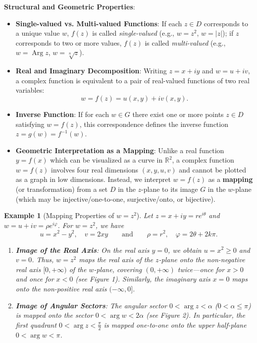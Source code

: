 \documentclass[11pt,a4paper]{article}
\theoremstyle{definitionbreak}
\theoremstyle{examplebreak}
\newtheorem{example}{Example}
\theoremstyle{plain}
\begin{document}
\textbf{Structural and Geometric Properties}:
\begin{itemize}
    \item \textbf{Single-valued vs. Multi-valued Functions}: If each $z \in D$ corresponds to a unique value $w$, $f(z)$ is called \emph{single-valued} (e.g., $w = z^2$, $w = |z|$); if $z$ corresponds to two or more values, $f(z)$ is called \emph{multi-valued} (e.g., $w = \operatorname{Arg} z$, $w = \sqrt[n]{z}$).
    \item \textbf{Real and Imaginary Decomposition}: Writing $z = x + iy$ and $w = u + iv$, a complex function is equivalent to a pair of real-valued functions of two real variables:
    \[
        w = f(z) = u(x, y) + i v(x, y).
    \]
    \item \textbf{Inverse Function}: If for each $w \in G$ there exist one or more points $z \in D$ satisfying $w = f(z)$, this correspondence defines the inverse function $z = g(w) = f^{-1}(w)$.
    \item \textbf{Geometric Interpretation as a Mapping}: Unlike a real function $y = f(x)$ which can be visualized as a curve in $\mathbb{R}^2$, a complex function $w = f(z)$ involves four real dimensions $(x, y, u, v)$ and cannot be plotted as a graph in low dimensions. Instead, we interpret $w = f(z)$ as a \textbf{mapping} (or transformation) from a set $D$ in the $z$-plane to its image $G$ in the $w$-plane (which may be injective/one-to-one, surjective/onto, or bijective).
\end{itemize}

\begin{example}[Mapping Properties of $w = z^2$]
Let $z = x + iy = r e^{i\theta}$ and $w = u + iv = \rho e^{i\varphi}$. For $w = z^2$, we have
\[
    u = x^2 - y^2, \quad v = 2xy \qquad \text{and} \qquad \rho = r^2, \quad \varphi = 2\theta + 2k\pi.
\]
\begin{enumerate}
    \item \textbf{Image of the Real Axis}: On the real axis $y = 0$, we obtain $u = x^2 \ge 0$ and $v = 0$. Thus, $w = z^2$ maps the real axis of the $z$-plane onto the non-negative real axis $[0, +\infty)$ of the $w$-plane, covering $(0, +\infty)$ twice—once for $x > 0$ and once for $x < 0$ (see Figure 1). Similarly, the imaginary axis $x = 0$ maps onto the non-positive real axis $(-\infty, 0]$.
    \item \textbf{Image of Angular Sectors}: The angular sector $0 < \arg z < \alpha$ ($0 < \alpha \le \pi$) is mapped onto the sector $0 < \arg w < 2\alpha$ (see Figure 2). In particular, the first quadrant $0 < \arg z < \frac{\pi}{2}$ is mapped one-to-one onto the upper half-plane $0 < \arg w < \pi$.
\end{enumerate}
\end{example}
\end{document}
